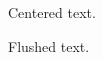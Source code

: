 \documentclass{article}
\begin{document}
\begin{center}
  Centered text.
\end{center}

\begin{flushright}
  Flushed text.
\end{flushright}
\end{document}
